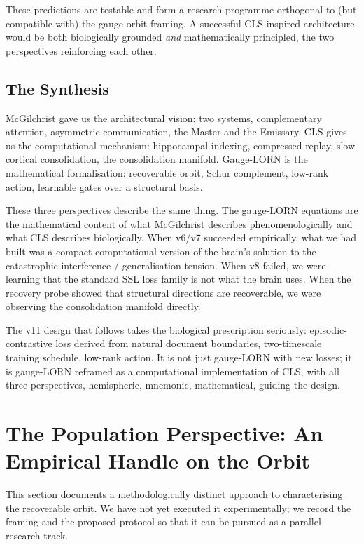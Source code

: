 \documentclass[11pt, a4paper]{article}
\theoremstyle{plain}
\theoremstyle{definition}
\theoremstyle{remark}
\begin{document}
These predictions are testable and form a research programme orthogonal to (but compatible with) the gauge-orbit framing.
A successful CLS-inspired architecture would be both biologically grounded \emph{and} mathematically principled, the two perspectives reinforcing each other.

\subsection{The Synthesis}

McGilchrist gave us the architectural vision: two systems, complementary attention, asymmetric communication, the Master and the Emissary.
CLS gives us the computational mechanism: hippocampal indexing, compressed replay, slow cortical consolidation, the consolidation manifold.
Gauge-LORN is the mathematical formalisation: recoverable orbit, Schur complement, low-rank action, learnable gates over a structural basis.

These three perspectives describe the same thing.
The gauge-LORN equations are the mathematical content of what McGilchrist describes phenomenologically and what CLS describes biologically.
When v6/v7 succeeded empirically, what we had built was a compact computational version of the brain's solution to the catastrophic-interference / generalisation tension.
When v8 failed, we were learning that the standard SSL loss family is not what the brain uses.
When the recovery probe showed that structural directions are recoverable, we were observing the consolidation manifold directly.

The v11 design that follows takes the biological prescription seriously: episodic-contrastive loss derived from natural document boundaries, two-timescale training schedule, low-rank action.
It is not just gauge-LORN with new losses; it is gauge-LORN reframed as a computational implementation of CLS, with all three perspectives, hemispheric, mnemonic, mathematical, guiding the design.


\section{The Population Perspective: An Empirical Handle on the Orbit}
\label{sec:population-perspective}

This section documents a methodologically distinct approach to characterising the recoverable orbit.
We have not yet executed it experimentally; we record the framing and the proposed protocol so that it can be pursued as a parallel research track.
\end{document}
